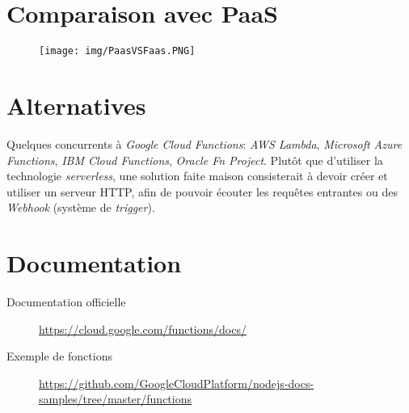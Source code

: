 \documentclass[a4paper, 11pt]{book}
\begin{document}
\section*{Comparaison avec PaaS}
\begin{figure}[H]
	\texttt{[image: img/PaasVSFaas.PNG]}
    \centering
\end{figure}

\section*{Alternatives}
Quelques concurrents à \textit{Google Cloud Functions}: \textit{AWS Lambda}, \textit{Microsoft Azure Functions}, \textit{IBM Cloud Functions}, \textit{Oracle Fn Project}. Plutôt que d'utiliser la technologie \textit{serverless}, une solution faite maison consisterait à devoir créer et utiliser un serveur HTTP, afin de pouvoir écouter les requêtes entrantes ou des \textit{Webhook} (système de \textit{trigger}).

\section*{Documentation}
\begin{description}
  \item[Documentation officielle] \url{https://cloud.google.com/functions/docs/}
  \item[Exemple de fonctions] \url{https://github.com/GoogleCloudPlatform/nodejs-docs-samples/tree/master/functions}
\end{description}
\end{document}
